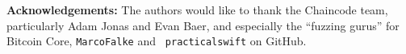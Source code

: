 
\begin{sloppypar}
{\bf Acknowledgements:} The authors would like to thank the Chaincode
team, particularly Adam Jonas and Evan Baer, and especially the
``fuzzing gurus'' for Bitcoin Core, {\tt MarcoFalke} and {\tt
  practicalswift} on GitHub.
\end{sloppypar}